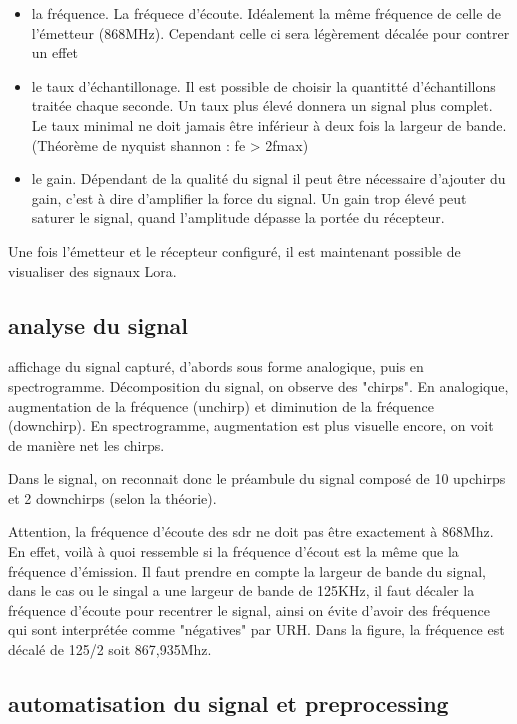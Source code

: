 \begin{itemize}
\item la fréquence. La fréquece d'écoute. Idéalement la même fréquence de celle de l'émetteur (868MHz). Cependant celle ci sera légèrement décalée pour contrer un effet
\item le taux d'échantillonage. Il est possible de choisir la quantitté d'échantillons traitée chaque seconde. Un taux plus élevé donnera un signal plus complet. Le taux minimal ne doit jamais être inférieur à deux fois la largeur de bande. (Théorème de nyquist shannon : fe > 2fmax)
\item le gain. Dépendant de la qualité du signal il peut être nécessaire d'ajouter du gain, c'est à dire d'amplifier la force du signal. Un gain trop élevé peut saturer le signal, quand l'amplitude dépasse la portée du récepteur.
\end{itemize}

Une fois l'émetteur et le récepteur configuré, il est maintenant possible de visualiser des signaux Lora.

\subsection{analyse du signal}

affichage du signal capturé, d'abords sous forme analogique, puis en spectrogramme.
Décomposition du signal, on observe des "chirps". En analogique, augmentation de la fréquence (unchirp) et diminution de la fréquence (downchirp). En spectrogramme, augmentation est plus visuelle encore, on voit de manière net les chirps.

Dans le signal, on reconnait donc le préambule du signal composé de 10 upchirps et 2 downchirps (selon la théorie).

Attention, la fréquence d'écoute des sdr ne doit pas être exactement à 868Mhz. En effet, voilà à quoi ressemble si la fréquence d'écout est la même que la fréquence d'émission. Il faut prendre en compte la largeur de bande du signal, dans le cas ou le singal a une largeur de bande de 125KHz, il faut décaler la fréquence d'écoute pour recentrer le signal, ainsi on évite d'avoir des fréquence qui sont interprétée comme "négatives" par URH. Dans la figure, la fréquence est décalé de 125/2 soit 867,935Mhz.

\subsection{automatisation du signal et preprocessing}

